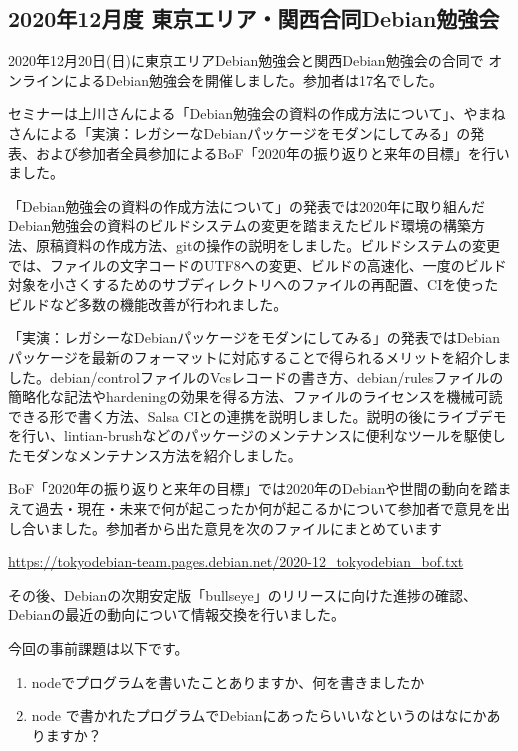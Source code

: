 \documentclass[mingoth,a4paper]{jsarticle}
\begin{document}
\subsection{2020年12月度 東京エリア・関西合同Debian勉強会}

2020年12月20日(日)に東京エリアDebian勉強会と関西Debian勉強会の合同で
オンラインによるDebian勉強会を開催しました。参加者は17名でした。

セミナーは上川さんによる「Debian勉強会の資料の作成方法について」、やまねさんによる「実演：レガシーなDebianパッケージをモダンにしてみる」の発表、および参加者全員参加によるBoF「2020年の振り返りと来年の目標」を行いました。

「Debian勉強会の資料の作成方法について」の発表では2020年に取り組んだDebian勉強会の資料のビルドシステムの変更を踏まえたビルド環境の構築方法、原稿資料の作成方法、gitの操作の説明をしました。ビルドシステムの変更では、ファイルの文字コードのUTF8への変更、ビルドの高速化、一度のビルド対象を小さくするためのサブディレクトリへのファイルの再配置、CIを使ったビルドなど多数の機能改善が行われました。

「実演：レガシーなDebianパッケージをモダンにしてみる」の発表ではDebianパッケージを最新のフォーマットに対応することで得られるメリットを紹介しました。debian/controlファイルのVcsレコードの書き方、debian/rulesファイルの簡略化な記法やhardeningの効果を得る方法、ファイルのライセンスを機械可読できる形で書く方法、Salsa CIとの連携を説明しました。説明の後にライブデモを行い、lintian-brushなどのパッケージのメンテナンスに便利なツールを駆使したモダンなメンテナンス方法を紹介しました。

BoF「2020年の振り返りと来年の目標」では2020年のDebianや世間の動向を踏まえて過去・現在・未来で何が起こったか何が起こるかについて参加者で意見を出し合いました。参加者から出た意見を次のファイルにまとめています

\url{https://tokyodebian-team.pages.debian.net/2020-12_tokyodebian_bof.txt}

その後、Debianの次期安定版「bullseye」のリリースに向けた進捗の確認、
Debianの最近の動向について情報交換を行いました。


今回の事前課題は以下です。

\begin{enumerate}
 \item nodeでプログラムを書いたことありますか、何を書きましたか
 \item node で書かれたプログラムでDebianにあったらいいなというのはなにかありますか？
\end{enumerate}
\end{document}
